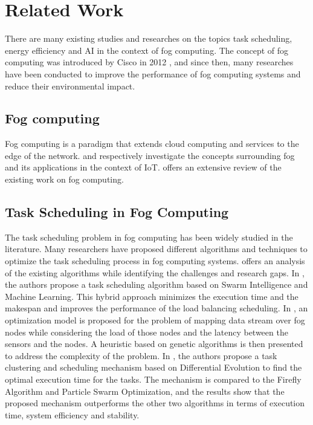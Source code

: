 \chapter*{Related Work}
\label{chap:relatedwork}

There are many existing studies and researches on the topics task scheduling, energy efficiency and AI in the context
of fog computing. The concept of fog computing was introduced by Cisco in 2012 \cite{bonomi-et-al-2012}, and since
then, many researches have been conducted to improve the performance of fog computing systems and reduce their
environmental impact.

\section*{Fog computing}

Fog computing is a paradigm that extends cloud computing and services to the edge of the network.
\cite{rana-abubacker-2023} and \cite{abubacker-et-al-2023} respectively investigate the concepts surrounding fog
and its applications in the context of IoT. \cite{al-musawi-et-al-2023} offers an extensive review of the existing
work on fog computing.

\section*{Task Scheduling in Fog Computing}

The task scheduling problem in fog computing has been widely studied in the literature. Many researchers have proposed
different algorithms and techniques to optimize the task scheduling process in fog computing systems.
\cite{misirli-casalicchio-2024} offers an analysis of the existing algorithms while identifying the challenges and
research gaps. In \cite{rjoub-bentahar-2017}, the authors propose a task scheduling algorithm based on Swarm
Intelligence and Machine Learning. This hybrid approach minimizes the execution time and the makespan and improves the
performance of the load balancing scheduling. In \cite{canali-lancellotti-2019}, an optimization model is proposed for
the problem of mapping data stream over fog nodes while considering the load of those nodes and the latency between the
sensors and the nodes. A heuristic based on genetic algorithms is then presented to address the complexity of the
problem. In \cite{yousif-et-al-2024}, the authors propose a task clustering and scheduling mechanism based on
Differential Evolution to find the optimal execution time for the tasks. The mechanism is compared to the Firefly
Algorithm and Particle Swarm Optimization, and the results show that the proposed mechanism outperforms the other two
algorithms in terms of execution time, system efficiency and stability.

